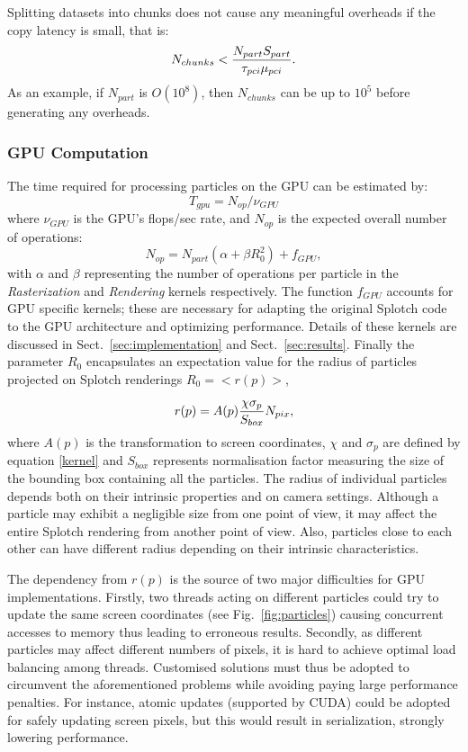\documentclass[smallextended]{svjour3}
\begin{document}
Splitting datasets into chunks does not cause any meaningful overheads if the copy latency is small, that is:
\begin{equation}
N_{chunks} < {N_{part} S_{part}\over \tau_{pci}\mu_{pci}}.
\end{equation}
As an example, if $N_{part}$ is $O(10^8)$, then $N_{chunks}$ can be up to $10^5$ before
generating any overheads. 

\subsubsection{GPU Computation}
The time required for processing particles on the GPU can be estimated by:
\begin{equation}
T_{gpu} = N_{op}/\nu_{GPU}
\end{equation}
where $\nu_{GPU}$ is the GPU's flops/sec rate, and $N_{op}$ is the expected overall number of operations:
\begin{equation}\label{ops}
N_{op} = N_{part}(\alpha + \beta R_0^2) + f_{GPU},
\end{equation}
with $\alpha$ and $\beta$ representing the number of operations per particle in the \textit{Rasterization} and \textit{Rendering} kernels respectively.
The function $f_{GPU}$ accounts for GPU specific kernels; these are necessary for adapting the original Splotch code to the GPU architecture and optimizing performance. Details of these kernels are discussed in Sect.~\ref{sec:implementation} and Sect.~\ref{sec:results}.
Finally the parameter $R_0$ encapsulates an expectation value for the radius of particles projected on Splotch renderings $R_0 = <r(p)>$,

\begin{equation}\label{radius}
r(p) = A(p){\chi \sigma_p\over S_{box}} N_{pix},
\end{equation} 
where $A(p)$ is the transformation to screen coordinates, $\chi$ and $\sigma_p$ are defined by equation \eqref{kernel} and $S_{box}$ represents 
normalisation factor measuring the size of the bounding box containing all the particles.
The radius of individual particles depends both on their intrinsic properties and on camera settings. Although a particle may exhibit a negligible size from one point of view, it may affect the entire Splotch rendering from another point of view. Also, particles close to each other can have different radius depending on their intrinsic characteristics.

The dependency from $r(p)$ is the source of two major difficulties for GPU implementations. Firstly, two threads acting on different particles could try 
to update the same screen coordinates (see Fig.~\ref{fig:particles}) causing concurrent accesses to memory thus leading to erroneous results. 
Secondly, as different particles may affect different numbers of pixels, it is hard to achieve optimal load balancing among threads.  
Customised solutions must thus be adopted to circumvent the aforementioned problems while avoiding paying large performance penalties. For instance, atomic updates (supported by CUDA) could be adopted for safely updating screen pixels, but this would result in serialization, strongly lowering performance. 
\end{document}
